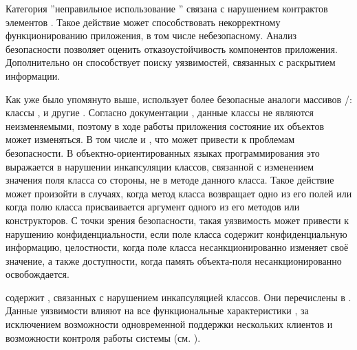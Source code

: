 %
Категория ''неправильное использование '' связана с нарушением контрактов элементов  . 
%
Такое действие может способствовать некорректному функционированию приложения, в том числе небезопасному. 
%
Анализ безопасности   позволяет оценить отказоустойчивость компонентов приложения. 
%
Дополнительно он способствует поиску уязвимостей, связанных с раскрытием информации. 

%
Как уже было упомянуто выше,  использует более безопасные аналоги массивов /: классы ,  и другие . 
%
Согласно документации  , данные классы не являются неизменяемыми, поэтому в ходе работы приложения состояние их объектов может изменяться. 
%
В том числе и , что может привести к проблемам безопасности.
%
В объектно-ориентированных языках программирования это выражается в нарушении инкапсуляции классов, связанной с изменением значения поля класса со стороны, не в методе данного класса.
%
Такое действие может произойти в случаях, когда метод класса возвращает одно из его полей или когда полю класса присваивается аргумент одного из его методов или конструкторов.
%
С точки зрения безопасности, такая уязвимость может привести к нарушению конфиденциальности, если поле класса содержит конфиденциальную информацию, целостности, когда поле класса несанкционированно изменяет своё значение, а также доступности, когда память объекта-поля несанкционированно освобождается. 

%
  содержит , связанных с нарушением инкапсуляцией классов. Они перечислены в . Данные уязвимости влияют на все функциональные характеристики , за исключением возможности одновременной поддержки нескольких клиентов и возможности контроля работы системы (см. ).


